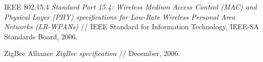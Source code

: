 \begin{thebibliography}{99}

 IEEE 802.15.4 {\slshape Standard Part 15.4: Wireless Medium Access Control (MAC) 
and Physical Layer (PHY) specifications for Low-Rate Wireless Personal Area Networks (LR-WPANs)}
// IEEE Standard for Information Technology, IEEE-SA Standards Board, 2006.

 ZigBee Alliance {\slshape ZigBee specification} // December, 2006.

\end{thebibliography} 
